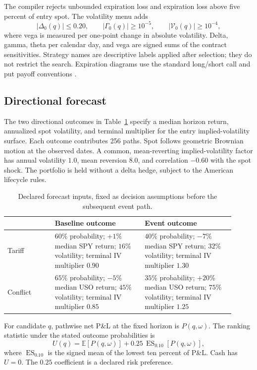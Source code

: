 \documentclass{strategynet-journal}
\newcommand{\ES}{\operatorname{ES}}
\begin{document}
The compiler rejects unbounded expiration loss and expiration loss above
five percent of entry spot.  The volatility menu adds
\[
  |\Delta_0(q)|\leq 0.20,\qquad
  |\Gamma_0(q)|\geq 10^{-5},\qquad
  |\mathcal V_0(q)|\geq 10^{-4},
\]
where vega is measured per one-point change in absolute volatility.  Delta,
gamma, theta per calendar day, and vega are signed sums of the contract
sensitivities.  Strategy names are descriptive labels applied after
selection; they do not restrict the search.  Expiration diagrams use the
standard long/short call and put payoff conventions \cite{occ}.

\subsection{Directional forecast}

The two directional outcomes in Table~\ref{tab:forecast-inputs} specify a
median horizon return, annualized spot volatility, and terminal multiplier
for the entry implied-volatility surface.  Each outcome contributes 256
paths.  Spot follows geometric Brownian motion at the observed dates.  A
common, mean-reverting implied-volatility factor has annual volatility
\(1.0\), mean reversion \(8.0\), and correlation \(-0.60\) with the spot
shock.  The portfolio is held without a delta hedge, subject to the
American lifecycle rules.

\begin{table}[H]
\centering
\small
\begin{tabular}{@{}p{0.19\linewidth}p{0.36\linewidth}p{0.36\linewidth}@{}}
\toprule
 & Baseline outcome & Event outcome \\
\midrule
Tariff &
\(60\%\) probability; \(+1\%\) median SPY return; \(16\%\) volatility;
terminal IV multiplier \(0.90\) &
\(40\%\) probability; \(-7\%\) median SPY return; \(32\%\) volatility;
terminal IV multiplier \(1.30\) \\
Conflict &
\(65\%\) probability; \(-5\%\) median USO return; \(45\%\) volatility;
terminal IV multiplier \(0.85\) &
\(35\%\) probability; \(+20\%\) median USO return; \(75\%\) volatility;
terminal IV multiplier \(1.25\) \\
\bottomrule
\end{tabular}
\caption{Declared forecast inputs, fixed as decision assumptions before the
subsequent event path.}
\label{tab:forecast-inputs}
\end{table}

For candidate \(q\), pathwise net P\&L at the fixed horizon is
\(P(q,\omega)\).  The ranking statistic under the stated outcome
probabilities is
\[
  U(q)=\mathbb E[P(q,\omega)]
       +0.25\,\ES_{0.10}[P(q,\omega)],
\]
where \(\ES_{0.10}\) is the signed mean of the lowest ten percent of P\&L.
Cash has \(U=0\).  The \(0.25\) coefficient is a declared risk preference.
\end{document}
